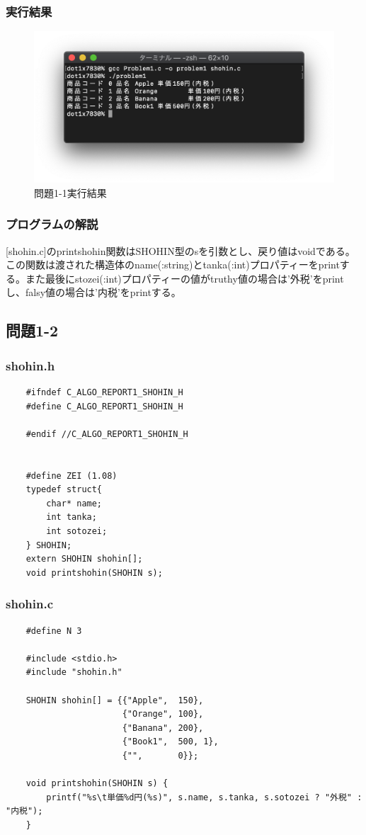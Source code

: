 \documentclass[10pt]{article}
\begin{document}
\subsubsection{実行結果}

\begin{figure}[H]
		\centering
		\includegraphics[]{problem1-1.png}
		\caption{問題1-1実行結果}
\end{figure}

\subsubsection{プログラムの解説}
[shohin.c]のprintshohin関数はSHOHIN型のsを引数とし、戻り値はvoidである。
この関数は渡された構造体のname(:string)とtanka(:int)プロパティーをprintする。また最後にstozei(:int)プロパティーの値がtruthy値の場合は'外税'をprintし、falsy値の場合は'内税'をprintする。
\pagebreak


\subsection{問題1-2}
\subsubsection{shohin.h}
    \begin{lstlisting}
    #ifndef C_ALGO_REPORT1_SHOHIN_H
    #define C_ALGO_REPORT1_SHOHIN_H
    
    #endif //C_ALGO_REPORT1_SHOHIN_H
    
    
    #define ZEI (1.08)
    typedef struct{
        char* name;
        int tanka;
        int sotozei;
    } SHOHIN;
    extern SHOHIN shohin[];
    void printshohin(SHOHIN s);
    \end{lstlisting}
\subsubsection{shohin.c}
    \begin{lstlisting}
    #define N 3
    
    #include <stdio.h>
    #include "shohin.h"
    
    SHOHIN shohin[] = {{"Apple",  150},
                       {"Orange", 100},
                       {"Banana", 200},
                       {"Book1",  500, 1},
                       {"",       0}};
    
    void printshohin(SHOHIN s) {
        printf("%s\t単価%d円(%s)", s.name, s.tanka, s.sotozei ? "外税" : "内税");
    }

    \end{lstlisting}
\end{document}

